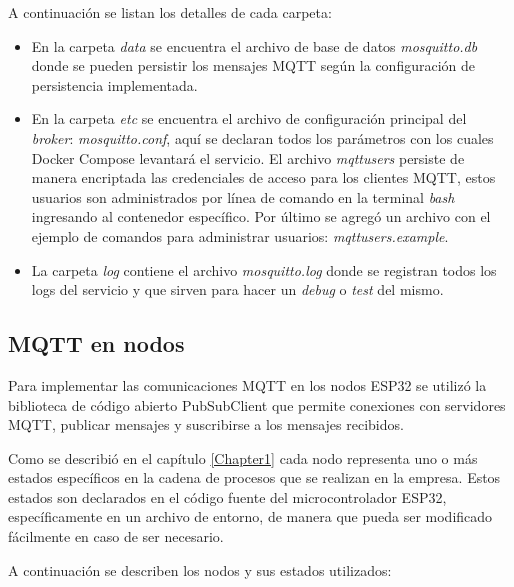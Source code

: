 A continuación se listan los detalles de cada carpeta:

\begin{itemize}
	\item En la carpeta \textit{data} se encuentra el archivo de base de datos \textit{mosquitto.db} donde se pueden persistir los mensajes MQTT según la configuración de persistencia implementada.
	\item En la carpeta \textit{etc} se encuentra el archivo de configuración principal del \textit{broker}: \textit{mosquitto.conf}, aquí se declaran todos los parámetros con los cuales Docker Compose levantará el servicio. El archivo \textit{mqttusers} persiste de manera encriptada las credenciales de acceso para los clientes MQTT, estos usuarios son administrados por línea de comando en la terminal \textit{bash} ingresando al contenedor específico. Por último se agregó un archivo con el ejemplo de comandos para administrar usuarios: \textit{mqttusers.example}.
	\item La carpeta \textit{log} contiene el archivo \textit{mosquitto.log} donde se registran todos los logs del servicio y que sirven para hacer un \textit{debug} o \textit{test} del mismo.	
\end{itemize}


\subsection{MQTT en nodos}
\label{subsec:mqttnodos}
Para implementar las comunicaciones MQTT en los nodos ESP32 se utilizó la biblioteca de código abierto PubSubClient \citep{WEBSITE:pubsubclient} que permite conexiones con servidores MQTT, publicar mensajes y suscribirse a los mensajes recibidos.

Como se describió en el capítulo \ref{Chapter1} cada nodo representa uno o más estados específicos en la cadena de procesos que se realizan en la empresa. Estos estados son declarados en el código fuente del microcontrolador ESP32, específicamente en un archivo de entorno, de manera que pueda ser modificado fácilmente en caso de ser necesario.

A continuación se describen los nodos y sus estados utilizados:

